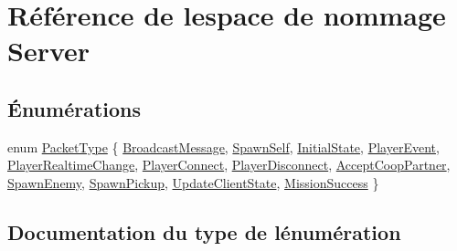 \hypertarget{namespace_server}{}\section{Référence de l\textquotesingle{}espace de nommage Server}
\label{namespace_server}
\subsection*{Énumérations}
\begin{DoxyCompactItemize}
\item 
enum \hyperlink{namespace_server_a3f01a66639d25aac95a4f661182e2220}{Packet\+Type} \{ \newline
\hyperlink{namespace_server_a3f01a66639d25aac95a4f661182e2220aced93ecd6ae2915a935cb93f6e2e468a}{Broadcast\+Message}, 
\hyperlink{namespace_server_a3f01a66639d25aac95a4f661182e2220a263855d0c43e279975057d6d68cb19bd}{Spawn\+Self}, 
\hyperlink{namespace_server_a3f01a66639d25aac95a4f661182e2220afcd771fd439a8203dfc2986541a1bf90}{Initial\+State}, 
\hyperlink{namespace_server_a3f01a66639d25aac95a4f661182e2220a158184557d74f27b4497b20b732cbdb8}{Player\+Event}, 
\newline
\hyperlink{namespace_server_a3f01a66639d25aac95a4f661182e2220aea9fb1dee56f9eb3bd803d070f86f1d6}{Player\+Realtime\+Change}, 
\hyperlink{namespace_server_a3f01a66639d25aac95a4f661182e2220a66fe5181417a2c1b1ff95de7ffdebd16}{Player\+Connect}, 
\hyperlink{namespace_server_a3f01a66639d25aac95a4f661182e2220ab29202e1e427bea4640df77fa0094b76}{Player\+Disconnect}, 
\hyperlink{namespace_server_a3f01a66639d25aac95a4f661182e2220abe17e0e325afb7b8e1ba2a9318fa00a8}{Accept\+Coop\+Partner}, 
\newline
\hyperlink{namespace_server_a3f01a66639d25aac95a4f661182e2220a1ce39219c1547fbdaa8f90a85ad17ee3}{Spawn\+Enemy}, 
\hyperlink{namespace_server_a3f01a66639d25aac95a4f661182e2220a82ca2c513e167389921212b2d6c59f70}{Spawn\+Pickup}, 
\hyperlink{namespace_server_a3f01a66639d25aac95a4f661182e2220a70ae0553a982e5d4c18b59372ea63186}{Update\+Client\+State}, 
\hyperlink{namespace_server_a3f01a66639d25aac95a4f661182e2220aa21e4dee284437e8378094dad71c0ba6}{Mission\+Success}
 \}
\end{DoxyCompactItemize}


\subsection{Documentation du type de l\textquotesingle{}énumération}
\hypertarget{namespace_server_a3f01a66639d25aac95a4f661182e2220}{}\label{namespace_server_a3f01a66639d25aac95a4f661182e2220} 
